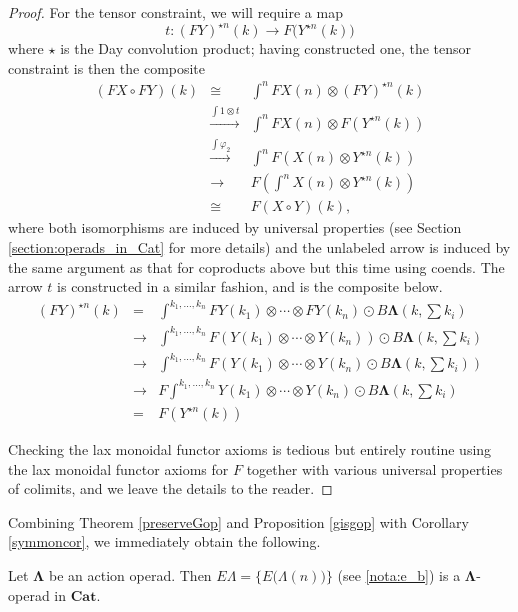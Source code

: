 \documentclass{amsbook} %
\newcommand{\mb}{\mathbf}
\numberwithin{section}{chapter}
\begin{document}
\begin{proof}
For the tensor constraint, we will require a map
\[
t:(FY)^{\star n}(k) \rightarrow F\big(Y^{\star n}(k)\big)
\]
 where $\star$ is the Day convolution product; having constructed one, the tensor constraint is then the composite
\[
\begin{array}{rcl}
(FX \circ FY)(k) & \cong & \int^{n} FX(n) \otimes (FY)^{\star n}(k) \\
& \stackrel{ \int 1 \otimes t}{\longrightarrow}  & \int^{n} FX(n) \otimes F(Y^{\star n}(k)) \\
& \stackrel{\int \varphi_{2}}{\longrightarrow}  & \int^{n} F(X(n) \otimes Y^{\star n}(k)) \\
& \longrightarrow & F (\int^{n} X(n) \otimes Y^{\star n}(k)) \\
& \cong & F(X \circ Y)(k),
\end{array}
\]
where both isomorphisms are induced by universal properties (see Section \ref{section:operads_in_Cat} for more details) and the unlabeled arrow is induced by the same argument as that for coproducts above but this time using coends.  The arrow $t$ is constructed in a similar fashion, and is the composite below.
\[
\begin{array}{rcl}
(FY)^{\star n}(k) & = & \int^{k_{1}, \ldots, k_{n}} FY(k_{1}) \otimes \cdots \otimes FY(k_{n}) \odot B\mb{\Lambda}(k, \sum k_{i}) \\
& \rightarrow &  \int^{k_{1}, \ldots, k_{n}} F(Y(k_{1}) \otimes \cdots \otimes Y(k_{n})) \odot B\mb{\Lambda}(k, \sum k_{i}) \\
& \rightarrow & \int^{k_{1}, \ldots, k_{n}} F(Y(k_{1}) \otimes \cdots \otimes Y(k_{n}) \odot B\mb{\Lambda}(k, \sum k_{i}) ) \\
& \rightarrow & F\int^{k_{1}, \ldots, k_{n}} Y(k_{1}) \otimes \cdots \otimes Y(k_{n}) \odot B\mb{\Lambda}(k, \sum k_{i})  \\
& = & F(Y^{\star n}(k))
\end{array}
\]

Checking the lax monoidal functor axioms is tedious but entirely routine using the lax monoidal functor axioms for $F$ together with various universal properties of colimits, and we leave the details to the reader.
\end{proof}



Combining Theorem \ref{preserveGop} and Proposition \ref{gisgop} with Corollary \ref{symmoncor}, we immediately obtain the following.

\begin{cor}\label{cor:elambda_lambdaop}
Let $\mb{\Lambda}$ be an action operad.  Then $E\Lambda = \{ E\big(\Lambda(n)\big) \}$ (see \cref{nota:e_b}) is a $\mb{\Lambda}$-operad in $\mb{Cat}$.
\end{cor}
\end{document}
